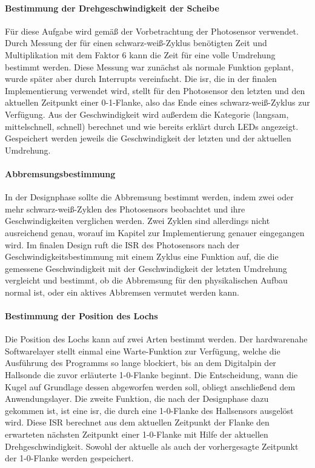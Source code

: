 \documentclass{kis}
\begin{document}
\paragraph{Bestimmung der Drehgeschwindigkeit der Scheibe}
Für diese Aufgabe wird gemäß der Vorbetrachtung der Photosensor verwendet. Durch Messung der für einen schwarz-weiß-Zyklus benötigten Zeit und Multiplikation mit dem Faktor 6 kann die Zeit für eine volle Umdrehung bestimmt werden. Diese Messung war zunächst als normale Funktion geplant, wurde später aber durch Interrupts vereinfacht. Die \gls{isr}, die in der finalen Implementierung verwendet wird, stellt für den Photosensor den letzten und den aktuellen Zeitpunkt einer 0-1-Flanke, also das Ende eines schwarz-weiß-Zyklus zur Verfügung. Aus der Geschwindigkeit wird außerdem die Kategorie (langsam, mittelschnell, schnell) berechnet und wie bereits erklärt durch LEDs angezeigt. Gespeichert werden jeweils die Geschwindigkeit der letzten und der aktuellen Umdrehung.

\paragraph{Abbremsungsbestimmung}
In der Designphase sollte die Abbremsung bestimmt werden, indem zwei oder mehr schwarz-weiß-Zyklen des Photosensors beobachtet und ihre Geschwindigkeiten verglichen werden. Zwei Zyklen sind allerdings nicht ausreichend genau, worauf im Kapitel zur Implementierung genauer eingegangen wird. Im finalen Design ruft die ISR des Photosensors nach der Geschwindigkeitsbestimmung mit einem Zyklus eine Funktion auf, die die gemessene Geschwindigkeit mit der Geschwindigkeit der letzten Umdrehung vergleicht und bestimmt, ob die Abbremsung für den physikalischen Aufbau normal ist, oder ein aktives Abbremsen vermutet werden kann.

\paragraph{Bestimmung der Position des Lochs}
Die Position des Lochs kann auf zwei Arten bestimmt werden. Der hardwarenahe Softwarelayer stellt einmal eine Warte-Funktion zur Verfügung, welche die Ausführung des Programms so lange blockiert, bis an dem Digitalpin der Hallsonde die zuvor erläuterte 1-0-Flanke beginnt. Die Entscheidung, wann die Kugel auf Grundlage dessen abgeworfen werden soll, obliegt anschließend dem Anwendungslayer. Die zweite Funktion, die nach der Designphase dazu gekommen ist, ist eine \gls{isr}, die durch eine 1-0-Flanke des Hallsensors ausgelöst wird. Diese ISR berechnet aus dem aktuellen Zeitpunkt der Flanke den erwarteten nächsten Zeitpunkt einer 1-0-Flanke mit Hilfe der aktuellen Drehgeschwindigkeit. Sowohl der aktuelle als auch der vorhergesagte Zeitpunkt der 1-0-Flanke werden gespeichert.
\end{document}
